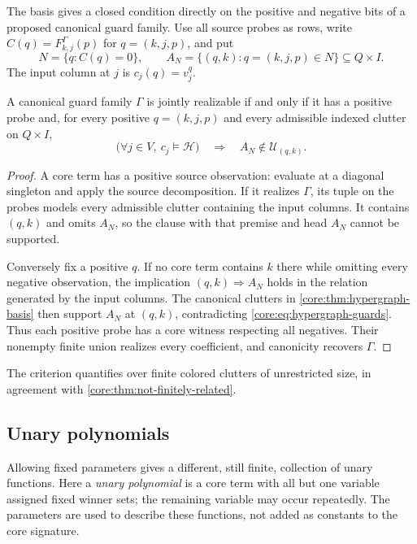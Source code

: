 The basis gives a closed condition directly on the positive and negative
bits of a proposed canonical guard family. Use all source probes as rows,
write $C(q)=F^\Gamma_{k,j}(p)$ for $q=(k,j,p)$, and put
\[
 N=\{q:C(q)=0\},\qquad
 A_N=\{(q,k):q=(k,j,p)\in N\}\subseteq Q\times I.
\]
The input column at $j$ is $c_j(q)=v^q_j$.

\begin{corollary}
\label{core:cor:hypergraph-guards}
A canonical guard family $\Gamma$ is jointly realizable if and only if it
has a positive probe and, for every positive $q=(k,j,p)$ and every
admissible indexed clutter on $Q\times I$,
\begin{equation}\label{core:eq:hypergraph-guards}
 \bigl(\forall j\in V,\ c_j\models\mathcal H\bigr)
 \quad\Longrightarrow\quad A_N\notin\mathcal U_{(q,k)}.
\end{equation}
\end{corollary}
\begin{proof}
A core term has a positive source observation: evaluate at a diagonal
singleton and apply the source decomposition. If it realizes $\Gamma$,
its tuple on the probes models every admissible clutter containing the input
columns. It contains $(q,k)$ and omits $A_N$, so the clause with that
premise and head $A_N$ cannot be supported.

Conversely fix a positive $q$. If no core term contains $k$ there while
omitting every negative observation, the implication
$(q,k)\Rightarrow A_N$ holds in the relation generated by the input
columns. The canonical clutters in \cref{core:thm:hypergraph-basis} then
support $A_N$ at $(q,k)$, contradicting
\eqref{core:eq:hypergraph-guards}. Thus each positive probe has a core
witness respecting all negatives. Their nonempty finite union realizes
every coefficient, and canonicity recovers $\Gamma$.
\end{proof}

The criterion quantifies over finite colored clutters of unrestricted
size, in agreement with \cref{core:thm:not-finitely-related}.

\subsection{Unary polynomials}

Allowing fixed parameters gives a different, still finite, collection of
unary functions. Here a \emph{unary polynomial} is a core term with all
but one variable assigned fixed winner sets; the remaining variable may
occur repeatedly. The parameters are used to describe these functions,
not added as constants to the core signature.

